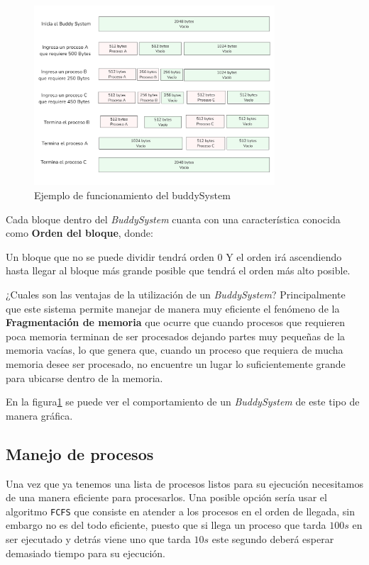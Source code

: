 \begin{figure}[!ht]
    \centering
    \includegraphics[width=0.8\textwidth]{src/figures/BuddyExample.png}
    \caption{Ejemplo de funcionamiento del buddySystem}\label{fig:buddyexample}
\end{figure}

\begin{note}
    Cada bloque dentro del \textit{BuddySystem} cuanta con una característica conocida como \textbf{Orden del bloque}, donde:

    Un bloque que no se puede dividir tendrá orden $0$ Y el orden irá ascendiendo hasta llegar al bloque más grande posible que tendrá el orden más alto posible.
\end{note}

¿Cuales son las ventajas de la utilización de un \textit{BuddySystem}? Principalmente que este sistema permite manejar de manera muy eficiente el fenómeno de la \textbf{Fragmentación de memoria} que ocurre que cuando procesos que requieren poca memoria terminan de ser procesados dejando partes muy pequeñas de la memoria vacías, lo que genera que, cuando un proceso que requiera de mucha memoria desee ser procesado, no encuentre un lugar lo suficientemente grande para ubicarse dentro de la memoria.

En la figura\ref{fig:buddyexample} se puede ver el comportamiento de un \textit{BuddySystem} de este tipo de manera gráfica.

\subsection{Manejo de procesos}
Una vez que ya tenemos una lista de procesos listos para su ejecución necesitamos de una manera eficiente para procesarlos. Una posible opción sería usar el algoritmo \texttt{FCFS} que consiste en atender a los procesos en el orden de llegada, sin embargo no es del todo eficiente, puesto que si llega un proceso que tarda $100s$ en ser ejecutado y detrás viene uno que tarda $10s$ este segundo deberá esperar demasiado tiempo para su ejecución.

